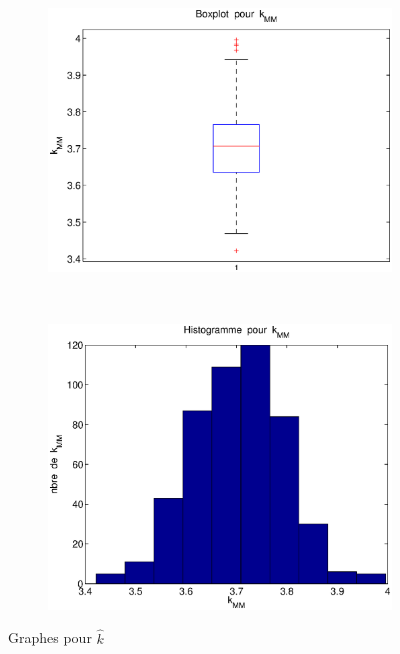 \begin{figure}[!ht]
        \centering
        \begin{subfigure}[b]{0.5\textwidth}
                \includegraphics[width=\textwidth]{graphes/boxplot_kmm.eps}
        \end{subfigure}%
        ~
        \begin{subfigure}[b]{0.5\textwidth}
                \includegraphics[width=\textwidth]{graphes/hist_kmm.eps}
        \end{subfigure}
        \caption{Graphes pour $\hat{k}$}\label{fig:kmm}
\end{figure}

